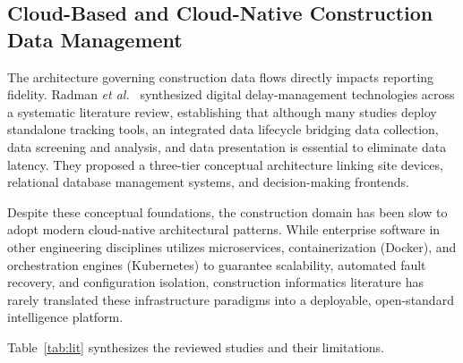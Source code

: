 \documentclass[conference]{IEEEtran}
\begin{document}
\subsection{Cloud-Based and Cloud-Native Construction Data Management}

The architecture governing construction data flows directly impacts reporting fidelity. Radman \emph{et al.}~\cite{radman2022digital} synthesized digital delay-management technologies across a systematic literature review, establishing that although many studies deploy standalone tracking tools, an integrated data lifecycle bridging data collection, data screening and analysis, and data presentation is essential to eliminate data latency. They proposed a three-tier conceptual architecture linking site devices, relational database management systems, and decision-making frontends.

Despite these conceptual foundations, the construction domain has been slow to adopt modern cloud-native architectural patterns. While enterprise software in other engineering disciplines utilizes microservices, containerization (Docker), and orchestration engines (Kubernetes) to guarantee scalability, automated fault recovery, and configuration isolation, construction informatics literature has rarely translated these infrastructure paradigms into a deployable, open-standard intelligence platform.

Table~\ref{tab:lit} synthesizes the reviewed studies and their limitations.
\end{document}
